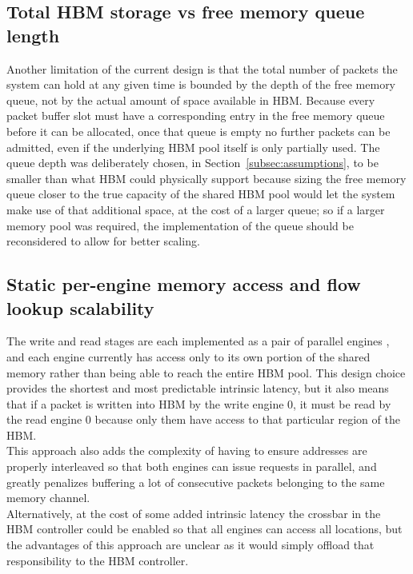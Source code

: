 \subsection{Total HBM storage vs free memory queue length}
Another limitation of the current design is that the total number of packets the system can
hold at any given time is bounded by the depth of the free memory queue, not by the actual
amount of space available in HBM. Because every packet buffer slot must have a corresponding
entry in the free memory queue before it can be allocated, once that queue is empty no further
packets can be admitted, even if the underlying HBM pool itself is only partially used. The
queue depth was deliberately chosen, in Section~\ref{subsec:assumptions}, to be smaller than
what HBM could physically support because sizing the free memory queue closer to the true capacity of
the shared HBM pool would let the system make use of that additional space, at the cost of a
larger queue; so if a larger memory pool was required, the implementation of the queue should be 
reconsidered to allow for better scaling.

\subsection{Static per-engine memory access and flow lookup scalability}

The write and read stages are each implemented as a pair of parallel engines
, and each engine currently has access only to its own portion of the shared memory rather 
than being able to reach the entire HBM pool. This design choice provides the shortest and most predictable 
intrinsic latency, but it also means that if a packet is written into HBM by the write engine 0, 
it must be read by the read engine 0 because only them have access to that particular region of the HBM. \\

This approach also adds the complexity of having to ensure addresses are properly interleaved so that both
engines can issue requests in parallel, and greatly penalizes buffering a lot of consecutive packets 
belonging to the same memory channel.\\

Alternatively, at the cost of some added intrinsic latency the crossbar in the HBM controller could be enabled 
so that all engines can access all locations, but the advantages of this approach are unclear 
as it would simply offload that responsibility to the HBM controller. \\

